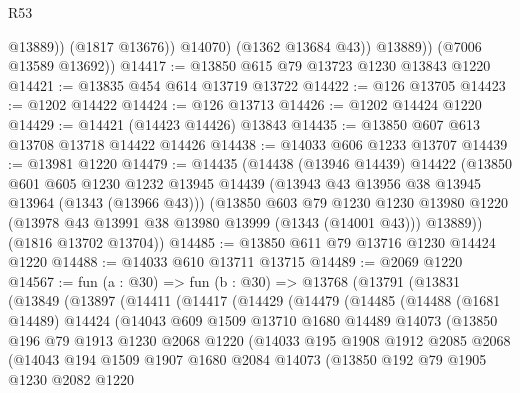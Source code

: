 \begin{lexlean}{R53}
\begin{coremodule}
                    @13889))
                (@1817 @13676))
              @14070)
            (@1362 @13684 @43))
          @13889))
      (@7006 @13589 @13692))
@14417 := @13850 @615 @79 @13723 @1230 @13843 @1220
@14421 := @13835 @454 @614 @13719 @13722
@14422 := @126 @13705
@14423 := @1202 @14422
@14424 := @126 @13713
@14426 := @1202 @14424 @1220
@14429 := @14421 (@14423 @14426) @13843
@14435 := @13850 @607 @613 @13708 @13718 @14422 @14426
@14438 := @14033 @606 @1233 @13707
@14439 := @13981 @1220
@14479 := @14435
    (@14438
      (@13946 @14439)
      @14422
      (@13850
        @601
        @605
        @1230
        @1232
        @13945
        @14439
        (@13943 @43 @13956 @38 @13945 @13964 (@1343 (@13966 @43)))
        (@13850
          @603
          @79
          @1230
          @1230
          @13980
          @1220
          (@13978 @43 @13991 @38 @13980 @13999 (@1343 (@14001 @43)))
          @13889))
      (@1816 @13702 @13704))
@14485 := @13850 @611 @79 @13716 @1230 @14424 @1220
@14488 := @14033 @610 @13711 @13715
@14489 := @2069 @1220
@14567 := fun (a : @30) =>
  fun (b : @30) =>
  @13768
    (@13791
      (@13831
        (@13849
          (@13897
            (@14411
              (@14417
                (@14429
                  (@14479
                    (@14485
                      (@14488
                        (@1681 @14489)
                        @14424
                        (@14043
                          @609
                          @1509
                          @13710
                          @1680
                          @14489
                          @14073
                          (@13850
                            @196
                            @79
                            @1913
                            @1230
                            @2068
                            @1220
                            (@14033
                              @195
                              @1908
                              @1912
                              @2085
                              @2068
                              (@14043
                                @194
                                @1509
                                @1907
                                @1680
                                @2084
                                @14073
                                (@13850
                                  @192
                                  @79
                                  @1905
                                  @1230
                                  @2082
                                  @1220

\end{coremodule}
\end{lexlean}
